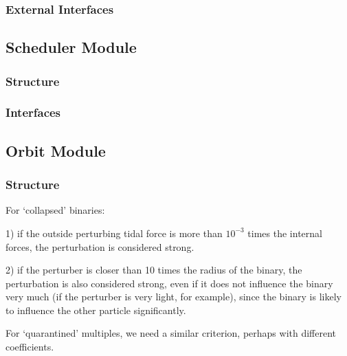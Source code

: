 \documentclass{article}[12pt]
\def\filler{xxxx xxxx xxxx xxxx xxxx xxxx xxxx xxxx xxxx xxxx xxxx xxxx
xxxx xxxx xxxx xxxx xxxx xxxx xxxx xxxx xxxx xxxx xxxx xxxx
xxxx xxxx xxxx xxxx xxxx xxxx xxxx xxxx xxxx xxxx xxxx xxxx
xxxx xxxx xxxx xxxx xxxx xxxx xxxx xxxx xxxx xxxx xxxx xxxx
xxxx xxxx xxxx xxxx xxxx xxxx xxxx xxxx xxxx xxxx xxxx xxxx
xxxx xxxx xxxx xxxx xxxx xxxx xxxx xxxx xxxx xxxx xxxx xxxx
xxxx xxxx xxxx xxxx xxxx xxxx xxxx xxxx xxxx xxxx xxxx xxxx
xxxx xxxx xxxx xxxx xxxx xxxx xxxx xxxx xxxx xxxx xxxx xxxx}
\def\filler{}
\begin{document}
\subsubsection{External Interfaces}

\filler

\subsection{Scheduler Module}

\filler

\subsubsection{Structure}

\filler

\subsubsection{Interfaces}

\filler


\filler


\filler

\subsection{Orbit Module}

\filler

\subsubsection{Structure}

\noindent
For `collapsed' binaries:

1) if the outside perturbing tidal force is more than $10^{-3}$ times the
internal forces, the perturbation is considered strong.

2) if the perturber is closer than 10 times the radius of the binary, the
perturbation is also considered strong, even if it does not influence
the binary very much (if the perturber is very light, for example), since
the binary is likely to influence the other particle significantly.

\noindent
For `quarantined' multiples, we need a similar criterion, perhaps with
different coefficients.
\end{document}
